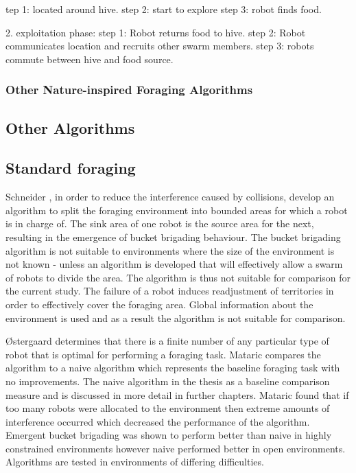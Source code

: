 tep 1: located around hive.
step 2: start to explore
step 3: robot finds food.

2. exploitation phase:
step 1: Robot returns food to hive. 
step 2: Robot communicates location and recruits other swarm members. 
step 3: robots commute between hive and food source. 


\subsubsection{Other Nature-inspired Foraging Algorithms}

\subsection{Other Algorithms}
\label{sec:second:otheralgorithms}

\subsection{Standard foraging}


Schneider \cite{schneider1998territorial}, in order to reduce the interference caused by collisions, develop an algorithm to split the foraging environment into bounded areas for which a robot is in charge of. The sink area of one robot is the source area for the next, resulting in the emergence of bucket brigading behaviour. The bucket brigading algorithm is not suitable to environments where the size of the environment is not known - unless an algorithm is developed that will effectively allow a swarm of robots to divide the area. The algorithm is thus not suitable for comparison for the current study. The failure of a robot induces readjustment of territories in order to effectively cover the foraging area. Global information about the environment is used and as a result the algorithm is not suitable for comparison. %

\O stergaard \cite{ostergaard2001emergent} determines that there is a finite number of any particular type of robot that is optimal for performing a foraging task. Mataric compares the algorithm to a naive algorithm which represents the baseline foraging task with no improvements. The naive algorithm in the thesis as a baseline comparison measure and is discussed in more detail in further chapters. Mataric found that if too many robots were allocated to the environment then extreme amounts of interference occurred which decreased the performance of the algorithm. Emergent bucket brigading was shown to perform better than naive in highly constrained environments however naive performed better in open environments. Algorithms are tested in environments of differing difficulties. %


